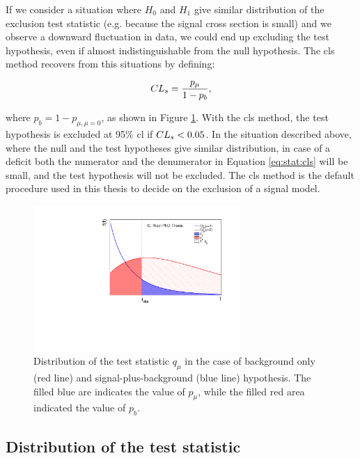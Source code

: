 If we consider a situation where $H_0$ and $H_1$ give similar distribution of the exclusion test statistic (e.g. because the signal cross section is
small) and we observe a downward fluctuation in data, we could end up excluding the test hypothesis, even if almost indistinguishable from the null hypothesis. The \gls{cls} method \cite{JUNK1999435} recovers from this situations by defining:

\begin{equation}
\label{eq:stat:cls}
CL_s = \dfrac{p_\mu}{1 - p_b} , 
\end{equation}

\noindent where $p_b = 1 - p_{\mu, \mu=0}$, as shown in Figure \ref{fig:stat:pmu_pb}. With the \gls{cls} method, the test hypothesis is excluded at 95\% \gls{cl} if $CL_s < 0.05$. In the situation described above, where the null and the test hypotheses give similar \qmu distribution, in case of a deficit both the numerator and the denumerator in Equation \ref{eq:stat:cls} will be small, and the test hypothesis will not be excluded. The \gls{cls} method is the default procedure used in this thesis to decide on the exclusion of a signal model. 


\begin{figure}
\centering
\includegraphics[width=0.7\textwidth]{produce_plots/stat/pmu_pb.pdf}
\caption{Distribution of the test statistic $q_\mu$ in the case of background only (red line) and signal-plus-background (blue line) hypothesis. The filled blue are indicates the value of $p_\mu$, while the filled red area indicated the value of $p_b$.}
\label{fig:stat:pmu_pb}
\end{figure}

\subsection{Distribution of the test statistic}

